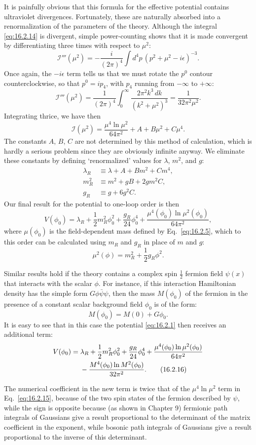 It is painfully obvious that this formula for the effective potential
contains ultraviolet divergences. Fortunately, these are naturally absorbed
into a renormalization of the parameters of the theory. Although the
integral \eqref{eq:16.2.14} is divergent, simple power-counting shows that it is
made convergent by differentiating three times with respect to $\mu^2$:
\[
 \mathcal{I}'''(\mu^2) = -\frac{i}{(2\pi)^4}\int d^4p\,
 \left(p^2+\mu^2-i\epsilon\right)^{-3} .
\]
Once again, the $-i\epsilon$ term tells us that we must rotate the $p^0$ contour
counterclockwise, so that $p^0=ip_4$, with $p_4$ running from $-\infty$ to $+\infty$:
\[
 \mathcal{I}'''(\mu^2) = \frac{1}{(2\pi)^4}\int_0^\infty
 \frac{2\pi^2 k^3\,dk}{(k^2+\mu^2)^3} = \frac{1}{32\pi^2\mu^2} .
\]
Integrating thrice, we have then
\[
 \mathcal{I}(\mu^2) = \frac{\mu^4\ln\mu^2}{64\pi^2}+A+B\mu^2+C\mu^4 .
\]
The constants $A$, $B$, $C$ are not determined by this method of calculation,
which is hardly a serious problem since they are obviously infinite anyway.
We eliminate these constants by defining `renormalized' values for $\lambda$, $m^2$,
and $g$:
\begin{align*}
 \lambda_R &\equiv \lambda+A+Bm^2+Cm^4 ,\\
 m_R^2 &\equiv m^2+gB+2gm^2C ,\\
 g_R &\equiv g+6g^2C .
\end{align*}
Our final result for the potential to one-loop order is then
\begin{equation}
 V(\phi_0) = \lambda_R+\frac{1}{2}m_R^2\phi_0^2+\frac{g_R}{24}\phi_0^4
 +\frac{\mu^4(\phi_0)\ln\mu^2(\phi_0)}{64\pi^2} ,
 \tag{16.2.15}
 \label{eq:16.2.15}
\end{equation}
where $\mu(\phi_0)$ is the field-dependent mass defined by Eq.~\eqref{eq:16.2.5}, which to
this order can be calculated using $m_R$ and $g_R$ in place of $m$ and $g$:
\[
 \mu^2(\phi) = m_R^2+\frac{1}{2}g_R\phi^2 .
\]

Similar results hold if the theory contains a complex spin $\frac{1}{2}$ fermion
field $\psi(x)$ that interacts with the scalar $\phi$. For instance, if this interaction
Hamiltonian density has the simple form $G\phi\bar\psi\psi$, then the mass $M(\phi_0)$ of
the fermion in the presence of a constant scalar background field $\phi_0$ is of
the form:
\[
 M(\phi_0) = M(0)+G\phi_0 .
\]
It is easy to see that in this case the potential \eqref{eq:16.2.1} then receives an
additional term:
\begin{align}
 V(\phi_0) ={}& \lambda_R+\frac{1}{2}m_R^2\phi_0^2+\frac{g_R}{24}\phi_0^4
 +\frac{\mu^4(\phi_0)\ln\mu^2(\phi_0)}{64\pi^2} \notag\\
 &{}-\frac{M^4(\phi_0)\ln M^2(\phi_0)}{32\pi^2} .
 \tag{16.2.16}
 \label{eq:16.2.16}
\end{align}

The numerical coefficient in the new term is twice that of the $\mu^4\ln\mu^2$ term
in Eq.~\eqref{eq:16.2.15}, because of the two spin states of the fermion described by
$\psi$, while the sign is opposite because (as shown in Chapter 9) fermionic
path integrals of Gaussians give a result proportional to the determinant
of the matrix coefficient in the exponent, while bosonic path integrals of
Gaussians give a result proportional to the inverse of this determinant.
